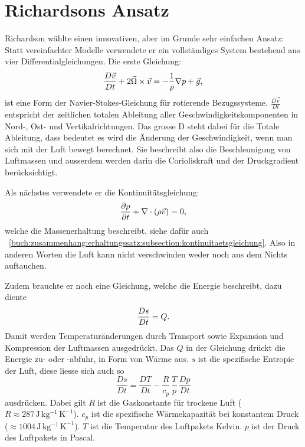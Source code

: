 %
%
%
%
\section{Richardsons Ansatz \label{geostrophisch:section:richardsonAnsatz}}

Richardson wählte einen innovativen, aber im Grunde sehr einfachen Ansatz:  
Statt vereinfachter Modelle verwendete er ein vollständiges System bestehend aus vier Differentialgleichungen.
Die erste Gleichung:
\begin{equation}
	\frac{D\vec{v}}{Dt} + 2\vec{\Omega} \times \vec{v} = -\frac{1}{\rho}\nabla p + \vec{g} \\,
	\label{eq:navstok}
\end{equation}
ist eine Form der Navier-Stokes-Gleichung für rotierende Bezugssysteme.
$\frac{D\vec{v}}{Dt}$ entspricht der zeitlichen totalen Ableitung aller Geschwindigkeitskomponenten in Nord-, Ost- und Vertikalrichtungen.
Das grosse D steht dabei für die Totale Ableitung, dass bedeutet es wird die Änderung der Geschwindigkeit, wenn man sich mit der Luft bewegt berechnet. 
Sie beschreibt also die Beschleunigung von Luftmassen und ausserdem werden darin die Corioliskraft und der Druckgradient berücksichtigt.

Als nächstes verwendete er die Kontinuitätsgleichung:
\begin{equation}
	\frac{\partial \rho}{\partial t} + \nabla \cdot (\rho \vec{v}) = 0 \\,
	\label{eq:kont}
\end{equation}
welche die Massenerhaltung beschreibt, siehe dafür auch ~\ref{buch:zusammenhang:erhaltungssatz:subsection:kontinuitaetsgleichung}.
Also in anderen Worten die Luft kann nicht verschwinden weder noch aus dem Nichts auftauchen. 

Zudem brauchte er noch eine Gleichung, welche die Energie beschreibt, dazu diente 
\begin{equation}
	\frac{Ds}{Dt} = Q \\.
	\label{eq:enrgy}
\end{equation}
Damit werden Temperaturänderungen durch Transport sowie Expansion und Kompression der Luftmassen ausgedrückt.
Das ${Q}$ in der Gleichung drückt die Energie zu- oder -abfuhr, in Form von Wärme aus.
$s$ ist die spezifische Entropie der Luft, diese liesse sich auch so 
\begin{equation}
	\frac{Ds}{Dt} = \frac{DT}{Dt} - \frac{R}{c_p} \, \frac{T}{p} \, \frac{Dp}{Dt}
	\label{eq:enrgy2}
\end{equation}
ausdrücken.
Dabei gilt $R$ ist die Gaskonstante für trockene Luft ($R \approx 287\,\mathrm{J\,kg^{-1}\,K^{-1}}$).
$c_p$ ist die spezifische Wärmekapazität bei konstantem Druck ($\approx 1004\,\mathrm{J\,kg^{-1}\,K^{-1}}$).
$T$ ist die Temperatur des Luftpakets Kelvin.
$p$ ist der Druck des Luftpakets in Pascal.

